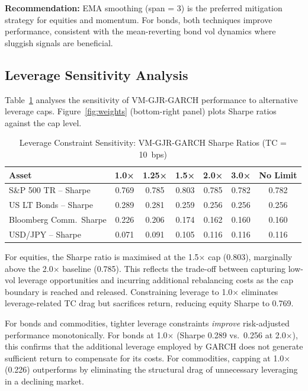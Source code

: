 \documentclass[12pt, a4paper]{article}
\begin{document}
\textbf{Recommendation:} EMA smoothing (span = 3) is the preferred mitigation strategy
for equities and momentum. For bonds, both techniques improve performance, consistent with
the mean-reverting bond vol dynamics where sluggish signals are beneficial.

\subsection{Leverage Sensitivity Analysis}

Table~\ref{tab:leverage} analyses the sensitivity of VM-GJR-GARCH performance to
alternative leverage caps. Figure~\ref{fig:weights} (bottom-right panel) plots Sharpe
ratios against the cap level.

\begin{table}[H]
  \centering
  \caption{Leverage Constraint Sensitivity: VM-GJR-GARCH Sharpe Ratios (TC = 10~bps)}
  \label{tab:leverage}
  \small
  \begin{tabular}{lcccccc}
    \toprule
    \textbf{Asset} & \textbf{1.0×} & \textbf{1.25×} & \textbf{1.5×}
                   & \textbf{2.0×} & \textbf{3.0×} & \textbf{No Limit} \\
    \midrule
    S\&P 500 TR -- Sharpe    & 0.769 & 0.785 & 0.803 & 0.785 & 0.782 & 0.782 \\
    US LT Bonds -- Sharpe    & 0.289 & 0.281 & 0.259 & 0.256 & 0.256 & 0.256 \\
    Bloomberg Comm.\ Sharpe  & 0.226 & 0.206 & 0.174 & 0.162 & 0.160 & 0.160 \\
    USD/JPY -- Sharpe         & 0.071 & 0.091 & 0.105 & 0.116 & 0.116 & 0.116 \\
    \bottomrule
  \end{tabular}
\end{table}

For equities, the Sharpe ratio is maximised at the 1.5$\times$ cap (0.803), marginally
above the 2.0$\times$ baseline (0.785). This reflects the trade-off between capturing
low-vol leverage opportunities and incurring additional rebalancing costs as the cap
boundary is reached and released. Constraining leverage to 1.0$\times$ eliminates
leverage-related TC drag but sacrifices return, reducing equity Sharpe to 0.769.

For bonds and commodities, tighter leverage constraints \emph{improve} risk-adjusted
performance monotonically. For bonds at 1.0$\times$ (Sharpe 0.289 vs.\ 0.256 at
2.0$\times$), this confirms that the additional leverage employed by GARCH does not
generate sufficient return to compensate for its costs. For commodities, capping at
1.0$\times$ (0.226) outperforms by eliminating the structural drag of unnecessary
leveraging in a declining market.
\end{document}

